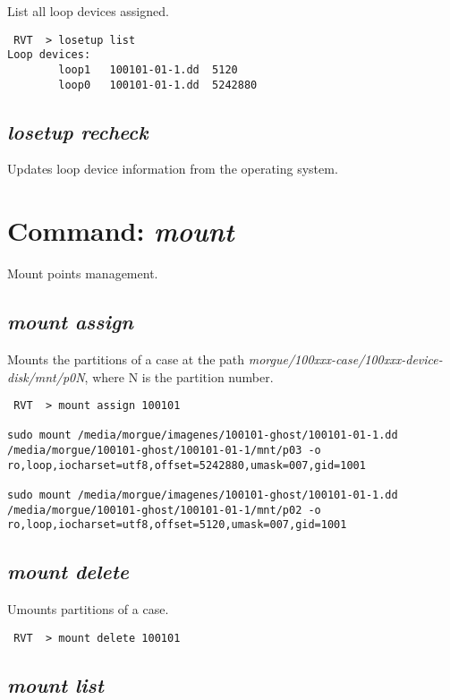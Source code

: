 \documentclass[a4paper,11pt,oneside]{report}
\begin{document}
List all loop devices assigned.

\begin{verbatim}
 RVT  > losetup list                                                          
Loop devices: 
        loop1   100101-01-1.dd  5120
        loop0   100101-01-1.dd  5242880
\end{verbatim}


\subsection{\emph{losetup recheck}}

Updates loop device information from the operating system.


\section{Command: \emph{mount}}

Mount points management.

\subsection{\emph{mount assign}}

Mounts the partitions of a case at the path \emph{morgue/100xxx-case/100xxx-device-disk/mnt/p0N}, where N is the partition number.

\begin{verbatim}
 RVT  > mount assign 100101

sudo mount /media/morgue/imagenes/100101-ghost/100101-01-1.dd /media/morgue/100101-ghost/100101-01-1/mnt/p03 -o ro,loop,iocharset=utf8,offset=5242880,umask=007,gid=1001

sudo mount /media/morgue/imagenes/100101-ghost/100101-01-1.dd /media/morgue/100101-ghost/100101-01-1/mnt/p02 -o ro,loop,iocharset=utf8,offset=5120,umask=007,gid=1001
\end{verbatim}


\subsection{\emph{mount delete}}

Umounts partitions of a case.

\begin{verbatim}
 RVT  > mount delete 100101
\end{verbatim}


\subsection{\emph{mount list}}
\end{document}
